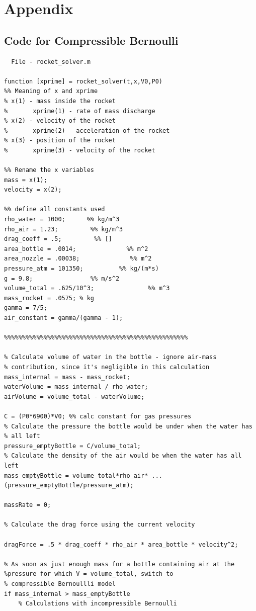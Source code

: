 \documentclass[12pt]{article}
\begin{document}
  \section{Appendix}
  \subsection{Code for Compressible Bernoulli}
  \begin{verbatim}
  File - rocket_solver.m
  
function [xprime] = rocket_solver(t,x,V0,P0)
%% Meaning of x and xprime
% x(1) - mass inside the rocket
%       xprime(1) - rate of mass discharge
% x(2) - velocity of the rocket
%       xprime(2) - acceleration of the rocket
% x(3) - position of the rocket
%       xprime(3) - velocity of the rocket

%% Rename the x variables
mass = x(1);
velocity = x(2);

%% define all constants used
rho_water = 1000;      %% kg/m^3
rho_air = 1.23;         %% kg/m^3
drag_coeff = .5;         %% []
area_bottle = .0014;              %% m^2
area_nozzle = .00038;              %% m^2
pressure_atm = 101350;          %% kg/(m*s)
g = 9.8;                %% m/s^2
volume_total = .625/10^3;               %% m^3
mass_rocket = .0575; % kg
gamma = 7/5;
air_constant = gamma/(gamma - 1);

%%%%%%%%%%%%%%%%%%%%%%%%%%%%%%%%%%%%%%%%%%%%%%%%%%%

% Calculate volume of water in the bottle - ignore air-mass
% contribution, since it's negligible in this calculation
mass_internal = mass - mass_rocket;
waterVolume = mass_internal / rho_water;
airVolume = volume_total - waterVolume;

C = (P0*6900)*V0; %% calc constant for gas pressures
% Calculate the pressure the bottle would be under when the water has
% all left
pressure_emptyBottle = C/volume_total; 
% Calculate the density of the air would be when the water has all left
mass_emptyBottle = volume_total*rho_air* ...
(pressure_emptyBottle/pressure_atm);

massRate = 0;

% Calculate the drag force using the current velocity

dragForce = .5 * drag_coeff * rho_air * area_bottle * velocity^2;

% As soon as just enough mass for a bottle containing air at the 
%pressure for which V = volume_total, switch to
% compressible Bernoullli model
if mass_internal > mass_emptyBottle
    % Calculations with incompressible Bernoulli 
    

\end{verbatim}
\end{document}
